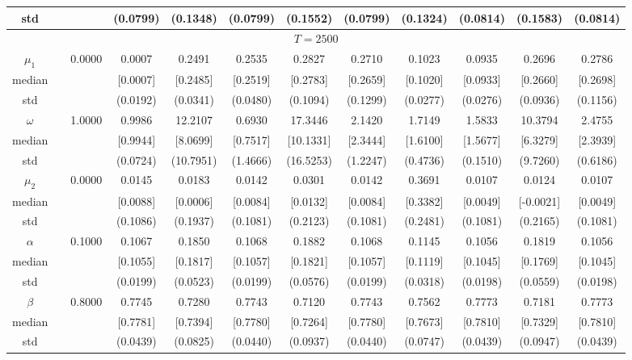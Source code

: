 {\begin{sidewaystable}
\begin{tabular}{cc cc| cccc| cccc}
std &&   & (0.0799) & (0.1348) & (0.0799) & (0.1552) & (0.0799) &(0.1324) & (0.0814) & (0.1583) & (0.0814)  \\ 
\hline 
\multicolumn{12}{c}{$T =2500$}  \\ 
\hline 
 \rowcolor{LightCyan} 
$\mu_{1}$&& 0.0000 & 0.0007 & 0.2491 & 0.2535 & 0.2827 & 0.2710 & 0.1023 & 0.0935 & 0.2696 & 0.2786  \\   
median &&  & [0.0007] & [0.2485] & [0.2519] & [0.2783] & [0.2659] & [0.1020] & [0.0933] & [0.2660] & [0.2698]  \\ 
std &&   & (0.0192) & (0.0341) & (0.0480) & (0.1094) & (0.1299) &(0.0277) & (0.0276) & (0.0936) & (0.1156)  \\ 
 \rowcolor{LightCyan} 
$\omega$&& 1.0000 & 0.9986 & 12.2107 & 0.6930 & 17.3446 & 2.1420 & 1.7149 & 1.5833 & 10.3794 & 2.4755  \\   
median &&  & [0.9944] & [8.0699] & [0.7517] & [10.1331] & [2.3444] & [1.6100] & [1.5677] & [6.3279] & [2.3939]  \\ 
std &&   & (0.0724) & (10.7951) & (1.4666) & (16.5253) & (1.2247) &(0.4736) & (0.1510) & (9.7260) & (0.6186)  \\ 
 \rowcolor{LightCyan} 
$\mu_{2}$&& 0.0000 & 0.0145 & 0.0183 & 0.0142 & 0.0301 & 0.0142 & 0.3691 & 0.0107 & 0.0124 & 0.0107  \\   
median &&  & [0.0088] & [0.0006] & [0.0084] & [0.0132] & [0.0084] & [0.3382] & [0.0049] & [-0.0021] & [0.0049]  \\ 
std &&   & (0.1086) & (0.1937) & (0.1081) & (0.2123) & (0.1081) &(0.2481) & (0.1081) & (0.2165) & (0.1081)  \\ 
 \rowcolor{LightCyan} 
$\alpha$&& 0.1000 & 0.1067 & 0.1850 & 0.1068 & 0.1882 & 0.1068 & 0.1145 & 0.1056 & 0.1819 & 0.1056  \\   
median &&  & [0.1055] & [0.1817] & [0.1057] & [0.1821] & [0.1057] & [0.1119] & [0.1045] & [0.1769] & [0.1045]  \\ 
std &&   & (0.0199) & (0.0523) & (0.0199) & (0.0576) & (0.0199) &(0.0318) & (0.0198) & (0.0559) & (0.0198)  \\ 
 \rowcolor{LightCyan} 
$\beta$&& 0.8000 & 0.7745 & 0.7280 & 0.7743 & 0.7120 & 0.7743 & 0.7562 & 0.7773 & 0.7181 & 0.7773  \\   
median &&  & [0.7781] & [0.7394] & [0.7780] & [0.7264] & [0.7780] & [0.7673] & [0.7810] & [0.7329] & [0.7810]  \\ 
std &&   & (0.0439) & (0.0825) & (0.0440) & (0.0937) & (0.0440) &(0.0747) & (0.0439) & (0.0947) & (0.0439)  \\ 

\end{tabular}
\end{sidewaystable}}

